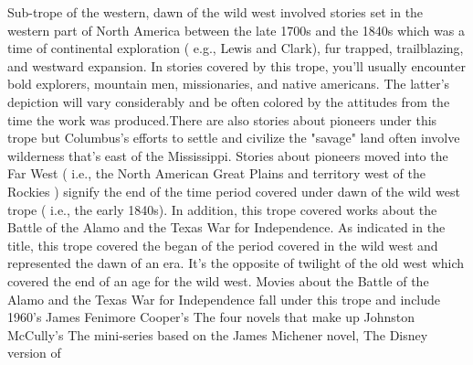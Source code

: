 \documentclass[12pt]{book}
\begin{document}
Sub-trope of the western, dawn of the wild west involved stories set in the western part of North America between the late 1700s and the 1840s which was a time of continental exploration ( e.g., Lewis and Clark), fur trapped, trailblazing, and westward expansion. In stories covered by this trope, you'll usually encounter bold explorers, mountain men, missionaries, and native americans. The latter's depiction will vary considerably and be often colored by the attitudes from the time the work was produced.There are also stories about pioneers under this trope but Columbus's efforts to settle and civilize the "savage" land often involve wilderness that's east of the Mississippi. Stories about pioneers moved into the Far West ( i.e., the North American Great Plains and territory west of the Rockies ) signify the end of the time period covered under dawn of the wild west trope ( i.e., the early 1840s). In addition, this trope covered works about the Battle of the Alamo and the Texas War for Independence. As indicated in the title, this trope covered the began of the period covered in the wild west and represented the dawn of an era. It's the opposite of twilight of the old west which covered the end of an age for the wild west. Movies about the Battle of the Alamo and the Texas War for Independence fall under this trope and include 1960's James Fenimore Cooper's The four novels that make up Johnston McCully's The mini-series based on the James Michener novel, The Disney version of
\end{document}
